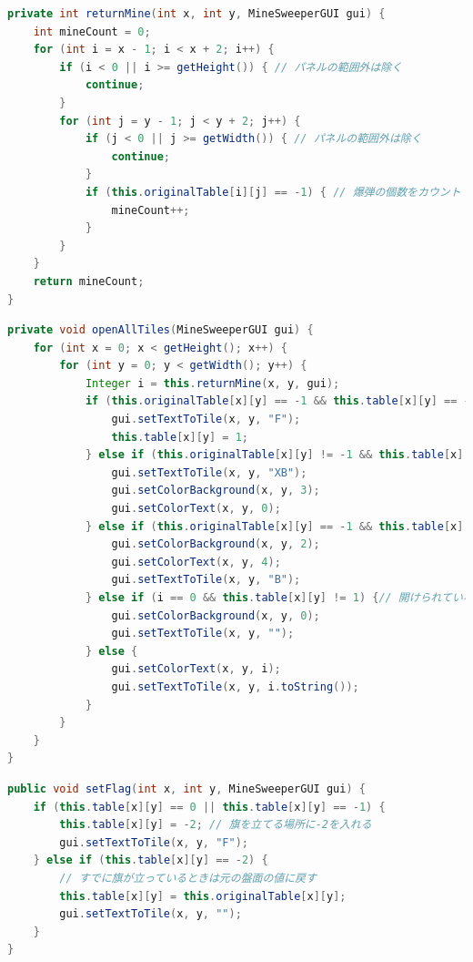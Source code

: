 \documentclass[a4j,11pt]{jsarticle}
\begin{document}
\begin{lstlisting}[caption=\ttfamily returnMine, label=src:returnMine, language=Java]
private int returnMine(int x, int y, MineSweeperGUI gui) {
    int mineCount = 0;
    for (int i = x - 1; i < x + 2; i++) {
        if (i < 0 || i >= getHeight()) { // パネルの範囲外は除く
            continue;
        }
        for (int j = y - 1; j < y + 2; j++) {
            if (j < 0 || j >= getWidth()) { // パネルの範囲外は除く
                continue;
            }
            if (this.originalTable[i][j] == -1) { // 爆弾の個数をカウント
                mineCount++;
            }
        }
    }
    return mineCount;
}
\end{lstlisting}
\begin{lstlisting}[caption=\ttfamily openAllTiles, label=src:openAllTiles, language=Java]
private void openAllTiles(MineSweeperGUI gui) {
    for (int x = 0; x < getHeight(); x++) {
        for (int y = 0; y < getWidth(); y++) {
            Integer i = this.returnMine(x, y, gui);
            if (this.originalTable[x][y] == -1 && this.table[x][y] == -2) {// 爆弾の場所にフラグ
                gui.setTextToTile(x, y, "F");
                this.table[x][y] = 1;
            } else if (this.originalTable[x][y] != -1 && this.table[x][y] == -2) {// 爆弾でない場所にフラグ
                gui.setTextToTile(x, y, "XB");
                gui.setColorBackground(x, y, 3);
                gui.setColorText(x, y, 0);
            } else if (this.originalTable[x][y] == -1 && this.table[x][y] != 1) {// 爆弾の場所にフラグがない
                gui.setColorBackground(x, y, 2);
                gui.setColorText(x, y, 4);
                gui.setTextToTile(x, y, "B");
            } else if (i == 0 && this.table[x][y] != 1) {// 開けられていない場所の周りの爆弾の個数が0
                gui.setColorBackground(x, y, 0);
                gui.setTextToTile(x, y, "");
            } else {
                gui.setColorText(x, y, i);
                gui.setTextToTile(x, y, i.toString());
            }
        }
    }
}
\end{lstlisting}
\begin{lstlisting}[caption=\ttfamily setFlag, label=src:setFlag, language=Java]
public void setFlag(int x, int y, MineSweeperGUI gui) {
    if (this.table[x][y] == 0 || this.table[x][y] == -1) {
        this.table[x][y] = -2; // 旗を立てる場所に-2を入れる
        gui.setTextToTile(x, y, "F");
    } else if (this.table[x][y] == -2) {
        // すでに旗が立っているときは元の盤面の値に戻す
        this.table[x][y] = this.originalTable[x][y];
        gui.setTextToTile(x, y, "");
    }
}
\end{lstlisting}
\end{document}
